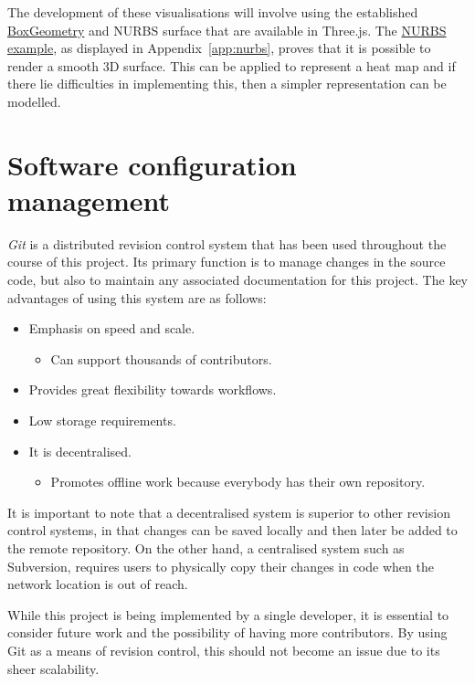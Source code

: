 The development of these visualisations will involve using the established \href{http://threejs.org/docs/#Reference/Extras.Geometries/BoxGeometry}{BoxGeometry} and NURBS surface that are available in Three.js. The \href{http://threejs.org/examples/webgl_geometry_nurbs.html}{NURBS example}, as displayed in Appendix~\ref{app:nurbs}, proves that it is possible to render a smooth 3D surface. This can be applied to represent a heat map and if there lie difficulties in implementing this, then a simpler representation can be modelled.

\section{Software configuration management} {

	\emph{Git} is a distributed revision control system that has been used throughout the course of this project. Its primary function is to manage changes in the source code, but also to maintain any associated documentation for this project. The key advantages of using this system are as follows:

	\begin{itemize}
		\item Emphasis on speed and scale.
			\begin{itemize}
				\item Can support thousands of contributors.
			\end{itemize}
		\item Provides great flexibility towards workflows.
		\item Low storage requirements.
		\item It is decentralised.
			\begin{itemize}
				\item Promotes offline work because everybody has their own repository.
			\end{itemize}
	\end{itemize}

	It is important to note that a decentralised system is superior to other revision control systems, in that changes can be saved locally and then later be added to the remote repository. On the other hand, a centralised system such as Subversion, requires users to physically copy their changes in code when the network location is out of reach.

	While this project is being implemented by a single developer, it is essential to consider future work and the possibility of having more contributors. By using Git as a means of revision control, this should not become an issue due to its sheer scalability.


}

